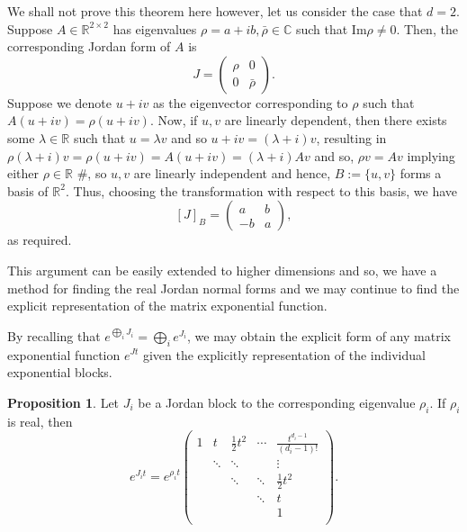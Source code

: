 \documentclass[
]{article}
\theoremstyle{definition}
\newtheorem{prop}{Proposition}
\theoremstyle{definition}
\begin{document}
We shall not prove this theorem here however, let us consider the case
that \(d = 2\). Suppose \(A \in \mathbb{R}^{2 \times 2}\) has
eigenvalues \(\rho = a + ib, \bar \rho \in \mathbb{C}\) such that
\(\text{Im} \rho \neq 0\). Then, the corresponding Jordan form of \(A\)
is \[J = \begin{pmatrix}
  \rho & 0 \\ 0 & \bar \rho
\end{pmatrix}.\] Suppose we denote \(u + iv\) as the eigenvector
corresponding to \(\rho\) such that \(A(u + iv) = \rho(u + iv)\). Now,
if \(u, v\) are linearly dependent, then there exists some
\(\lambda \in \mathbb{R}\) such that \(u = \lambda v\) and so
\(u + iv = (\lambda + i)v\), resulting in
\(\rho(\lambda + i)v =  \rho(u + iv) = A(u + iv) = (\lambda + i)Av\) and
so, \(\rho v = Av\) implying either \(\rho \in \mathbb{R}\) \#, so
\(u, v\) are linearly independent and hence, \(B := \{u, v\}\) forms a
basis of \(\mathbb{R}^2\). Thus, choosing the transformation with
respect to this basis, we have \[[J]_B = \begin{pmatrix}
  a & b \\ -b & a
\end{pmatrix},\] as required.

This argument can be easily extended to higher dimensions and so, we
have a method for finding the real Jordan normal forms and we may
continue to find the explicit representation of the matrix exponential
function.

By recalling that \(e^{\bigoplus_i J_i} = \bigoplus_i e^{J_i}\), we may
obtain the explicit form of any matrix exponential function \(e^{Jt}\)
given the explicitly representation of the individual exponential
blocks.

\begin{prop}
  Let \(J_i\) be a Jordan block to the corresponding eigenvalue \(\rho_i\). If 
  \(\rho_i\) is real, then 
  \[e^{J_i t} = e^{\rho_i t} 
    \begin{pmatrix}
      1 & t & \frac{1}{2}t^2 & \cdots & \frac{t^{d_i - 1}}{(d_i - 1)!}\\
        & \ddots & \ddots    & & \vdots\\
        &   & \ddots & \ddots & \frac{1}{2}t^2\\
        &   &   & \ddots & t\\
        &   &   &   & 1\\
    \end{pmatrix}.\]
\end{prop}
\proof
\end{document}
